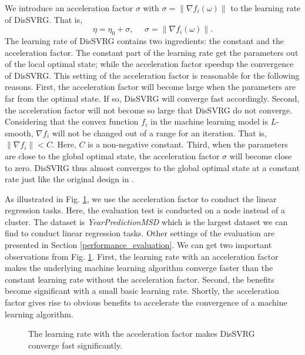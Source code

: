 \documentclass[preprint,review,11pt,a4paper]{elsarticle}
\begin{document}
We introduce an acceleration factor $\sigma$ with $\sigma=\parallel \nabla f_i(\omega)\parallel$ to the learning rate of DisSVRG. That is,
\begin{equation}
\eta=\eta_0+\sigma,~~~~~~\sigma=\parallel \nabla f_i(\omega)\parallel.
\end{equation}
The learning rate of DisSVRG contains two ingredients: the constant and the acceleration factor. The constant part of the learning rate get the parameters out of the local optimal state; while the acceleration factor speedup the convergence of DisSVRG. This setting of the acceleration factor is reasonable for the following reasons. First, the acceleration factor will become large when the parameters are far from the optimal state. If so, DisSVRG will converge fast accordingly. Second, the acceleration factor will not become so large that DisSVRG do not converge. Considering that the convex function $f_i$ in the machine learning model is $L$-smooth, $\nabla f_i$ will not be changed out of  a range for an iteration. That is, $\parallel\nabla f_i\parallel<C$. Here, $C$ is a non-negative constant. Third, when the parameters are close to the global optimal state, the acceleration factor $\sigma$ will become close to zero. DisSVRG thus almost converges to the global optimal state at a constant rate just like the original design in \cite{Johnson:9MAvkbgy}.

As illustrated in Fig. \ref{figure_evaluation_accelerated_factor}, we use the acceleration factor to conduct the linear regression tasks. Here, the evaluation test is conducted on a node instead of a cluster. The dataset is \emph{YearPredictionMSD} which is the largest dataset we can find to conduct linear regression tasks. Other settings of the evaluation are presented in Section \ref{performance_evaluation}.  We can get two important observations from Fig. \ref{figure_evaluation_accelerated_factor}. First, the learning rate with an acceleration factor makes the underlying machine learning algorithm converge faster than the constant learning rate without the acceleration factor. Second, the benefits become significant with a small basic learning rate. Shortly, the acceleration factor gives rise to obvious benefits to accelerate the convergence of a machine learning algorithm.

\begin{figure}
\centering
{}
\caption{The learning rate with the acceleration factor makes DisSVRG converge fast significantly.}
\label{figure_evaluation_accelerated_factor}
\end{figure}
\end{document}
